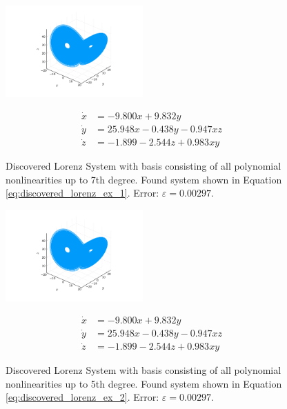 \documentclass[10pt]{paper}
\begin{document}
\begin{figure}[H]
	\caption{Discovered Lorenz System with basis consisting of all polynomial nonlinearities up to 7th degree. Found system shown in Equation \ref{eq:discovered_lorenz_ex_1}. Error: $\varepsilon = 0.00297$.}
	\label{fig:found_lorenz_ex_1}

	\centering 
	\includegraphics[width = 0.47\textwidth, trim={4.3cm, 1.6cm, 4.3cm, 2.5cm}, clip]{lorenz_1_sol.pdf}

	\begin{equation}\label{eq:discovered_lorenz_ex_1}
		\begin{split}
			\dot x &= -9.800x + 9.832y \\ 
			\dot y &= 25.948x -0.438y  -0.947xz \\
			\dot z &= -1.899  -2.544z + 0.983xy
		\end{split}
	\end{equation}
\end{figure}
\begin{figure}[H]
	\caption{Discovered Lorenz System with basis consisting of all polynomial nonlinearities up to 5th degree. Found system shown in Equation \ref{eq:discovered_lorenz_ex_2}. Error: $\varepsilon = 0.00297$.}
	\label{fig:found_lorenz_ex_2}

	\centering 
	\includegraphics[width = 0.47\textwidth, trim={4.3cm, 1.6cm, 4.3cm, 2.5cm}, clip]{lorenz_2_sol.pdf}

	\begin{equation}\label{eq:discovered_lorenz_ex_2}
		\begin{split}
			\dot x &= -9.800x + 9.832y \\ 
			\dot y &= 25.948x -0.438y  -0.947xz \\
			\dot z &= -1.899  -2.544z + 0.983xy
		\end{split}
	\end{equation}
\end{figure}
\end{document}
